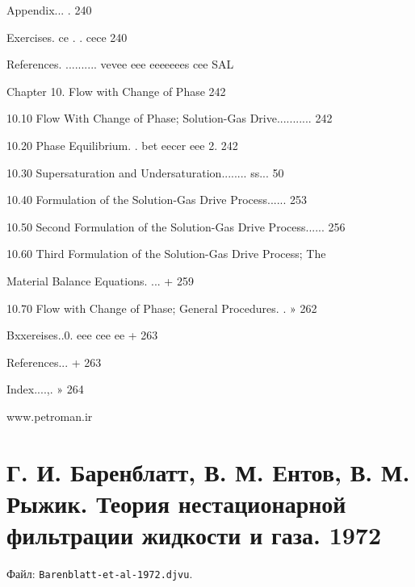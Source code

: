 \documentclass[
  11pt,
]{article}
\begin{document}
\smallskip
Appendix... . 240\par
Exercises. ce . . cece 240\par
References. .......... vevee eee eeeeeees cee SAL\par
Chapter 10. Flow with Change of Phase 242\par
10.10 Flow With Change of Phase; Solution-Gas Drive........... 242\par
10.20 Phase Equilibrium. . bet eecer eee 2. 242\par
10.30 Supersaturation and Undersaturation........ ss... 50\par
10.40 Formulation of the Solution-Gas Drive Process...... 253\par
10.50 Second Formulation of the Solution-Gas Drive Process...... 256\par
10.60 Third Formulation of the Solution-Gas Drive Process; The\par
Material Balance Equations. ... + 259\par
10.70 Flow with Change of Phase; General Procedures. . » 262\par
Bxxereises..0. eee cee ee + 263\par
References... + 263\par
Index....,. » 264\par
\smallskip
www.petroman.ir\par
\endgroup


\section{Г. И. Баренблатт, В. М. Ентов, В. М. Рыжик. Теория нестационарной фильтрации жидкости и газа. 1972}\label{section-08}

Файл: \texttt{Barenblatt-et-al-1972.djvu}.
\end{document}
